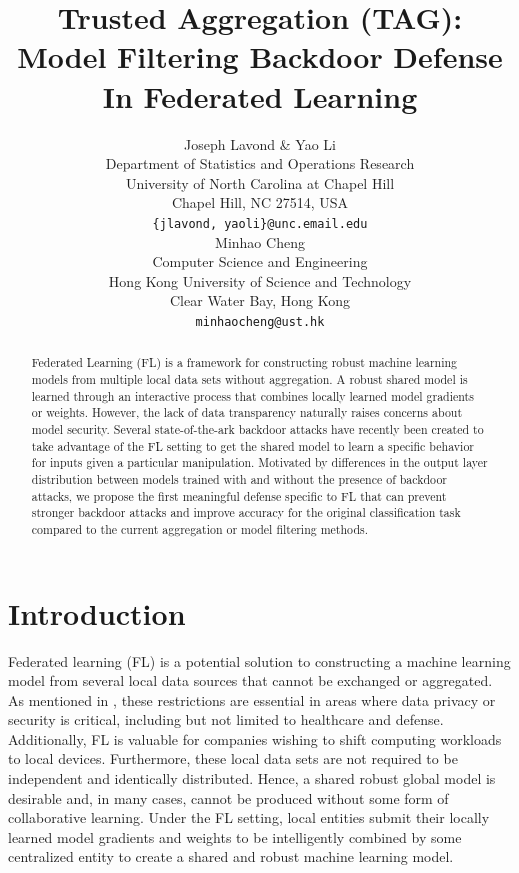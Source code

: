 \documentclass{article} %
\title{
    Trusted Aggregation (TAG): Model Filtering Backdoor Defense In Federated Learning
}
\author{%
    Joseph Lavond \& Yao Li  \\
    Department of Statistics and Operations Research \\
    University of North Carolina at Chapel Hill \\
    Chapel Hill, NC 27514, USA \\
    \texttt{\{jlavond, yaoli\}@unc.email.edu} \\
    \And
    Minhao Cheng \\
    Computer Science and Engineering \\
    Hong Kong University of Science and Technology \\
    Clear Water Bay, Hong Kong \\
    \texttt{minhaocheng@ust.hk}
}
\begin{document}
\maketitle

\begin{abstract}
    Federated Learning (FL) is a framework for constructing robust machine learning models from multiple local data sets without aggregation. A robust shared model is learned through an interactive process that combines locally learned model gradients or weights. However, the lack of data transparency naturally raises concerns about model security. Several state-of-the-ark backdoor attacks have recently been created to take advantage of the FL setting to get the shared model to learn a specific behavior for inputs given a particular manipulation. Motivated by differences in the output layer distribution between models trained with and without the presence of backdoor attacks, we propose the first meaningful defense specific to FL that can prevent stronger backdoor attacks and improve accuracy for the original classification task compared to the current aggregation or model filtering methods.
\end{abstract}



\section{Introduction}

Federated learning (FL) is a potential solution to constructing a machine learning model from several local data sources that cannot be exchanged or aggregated. As mentioned in \cite{fed-learn}, these restrictions are essential in areas where data privacy or security is critical, including but not limited to healthcare and defense. Additionally, FL is valuable for companies wishing to shift computing workloads to local devices. Furthermore, these local data sets are not required to be independent and identically distributed. Hence, a shared robust global model is desirable and, in many cases, cannot be produced without some form of collaborative learning. Under the FL setting, local entities submit their locally learned model gradients and weights to be intelligently combined by some centralized entity to create a shared and robust machine learning model.
\end{document}
